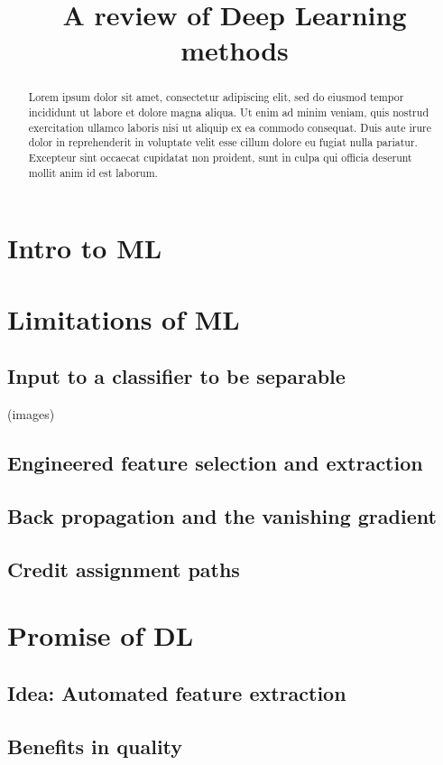 \documentclass[]{article}
\title{A review of Deep Learning methods}
\author{}
\begin{document}
\maketitle

\begin{abstract}
Lorem ipsum dolor sit amet, consectetur adipiscing elit, sed do eiusmod tempor incididunt ut labore et dolore magna aliqua. Ut enim ad minim veniam, quis nostrud exercitation ullamco laboris nisi ut aliquip ex ea commodo consequat. Duis aute irure dolor in reprehenderit in voluptate velit esse cillum dolore eu fugiat nulla pariatur. Excepteur sint occaecat cupidatat non proident, sunt in culpa qui officia deserunt mollit anim id est laborum.
\end{abstract}

\section{Intro to ML}
\section{Limitations of ML}
	\subsection{ Input to a classifier to be separable }
		(images)
	\subsection{Engineered feature selection and extraction}
	\subsection{Back propagation and  the vanishing gradient}
	\subsection{Credit assignment paths}
\section{Promise of DL}
	\subsection{Idea: Automated feature extraction}
	\subsection{Benefits in quality}
\end{document}
